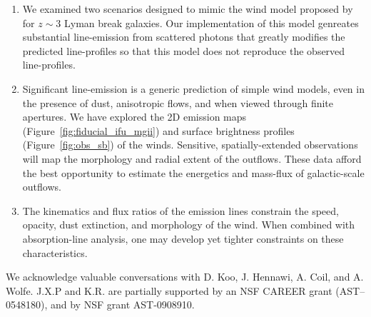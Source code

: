 \documentclass[12pt,preprint]{aastex}
\begin{document}
\begin{enumerate}
\item We examined two scenarios designed to mimic the wind model
  proposed by \cite{steidel+10} for $z \sim 3$ Lyman break galaxies.  Our
  implementation of this model genreates substantial line-emission
  from scattered photons that greatly modifies the predicted
  line-profiles so that this model does not reproduce the observed
  line-profiles. 


\item Significant line-emission is a generic prediction of simple wind
  models, even in the presence of dust, anisotropic flows, and when
  viewed through finite apertures.  We have explored the 2D emission
  maps (Figure~\ref{fig:fiducial_ifu_mgii}) and surface brightness 
  profiles (Figure~\ref{fig:obs_sb}) of
  the winds.  Sensitive, spatially-extended observations will map the
  morphology and radial extent of the outflows.  These data afford the
  best opportunity to estimate the energetics and mass-flux of
  galactic-scale outflows.

\item The kinematics and flux ratios of the emission lines 
  constrain the %
  speed, opacity, dust extinction, and morphology of the
  wind.  When combined with absorption-line analysis, one may develop
  yet tighter constraints on these characteristics.



\end{enumerate}

\acknowledgments

We acknowledge valuable conversations with D. Koo, J. Hennawi,
A. Coil, and A. Wolfe. 
J.X.P and K.R. are partially supported
by an NSF CAREER grant (AST--0548180), and 
by NSF grant AST-0908910.

\clearpage

%
%
%
%
\end{document}
